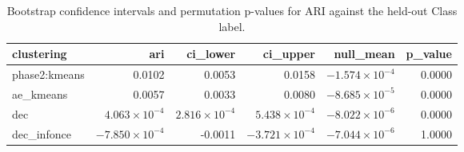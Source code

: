 \begin{table}[htbp]
\centering
\begin{tabular}{lrrrrr}
\toprule
clustering & ari & ci\_lower & ci\_upper & null\_mean & p\_value \\
\midrule
phase2:kmeans & 0.0102 & 0.0053 & 0.0158 & $-1.574\times 10^{-4}$ & 0.0000 \\
ae\_kmeans & 0.0057 & 0.0033 & 0.0080 & $-8.685\times 10^{-5}$ & 0.0000 \\
dec & $4.063\times 10^{-4}$ & $2.816\times 10^{-4}$ & $5.438\times 10^{-4}$ & $-8.022\times 10^{-6}$ & 0.0000 \\
dec\_infonce & $-7.850\times 10^{-4}$ & -0.0011 & $-3.721\times 10^{-4}$ & $-7.044\times 10^{-6}$ & 1.0000 \\
\bottomrule
\end{tabular}
\caption{Bootstrap confidence intervals and permutation p-values for ARI against the held-out Class label.}
\label{tab:significance}
\end{table}
